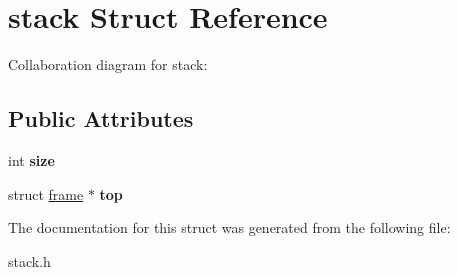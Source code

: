 \hypertarget{structstack}{}\section{stack Struct Reference}
\label{structstack}


Collaboration diagram for stack\+:
\subsection*{Public Attributes}
\begin{DoxyCompactItemize}
\item 
\mbox{\label{structstack_a926a597bae913d1bf4772be35c14b71e}} 
int {\bfseries size}
\item 
\mbox{\label{structstack_abd18164ced216eae55f47068d5e77547}} 
struct \hyperlink{structframe}{frame} $\ast$ {\bfseries top}
\end{DoxyCompactItemize}


The documentation for this struct was generated from the following file\+:\begin{DoxyCompactItemize}
\item 
stack.\+h\end{DoxyCompactItemize}
